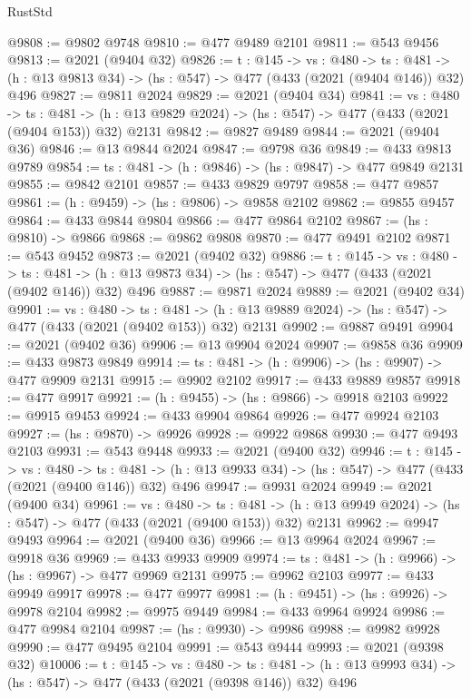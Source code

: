 \begin{lexlean}{RustStd}
\begin{coremodule}
@9808 := @9802 @9748
@9810 := @477 @9489 @2101
@9811 := @543 @9456
@9813 := @2021 (@9404 @32)
@9826 := {t : @145} ->
  {vs : @480} ->
  {ts : @481} -> (h : @13 @9813 @34) -> (hs : @547) -> @477 (@433 (@2021 (@9404 @146)) @32) @496
@9827 := @9811 @2024
@9829 := @2021 (@9404 @34)
@9841 := {vs : @480} ->
  {ts : @481} -> (h : @13 @9829 @2024) -> (hs : @547) -> @477 (@433 (@2021 (@9404 @153)) @32) @2131
@9842 := @9827 @9489
@9844 := @2021 (@9404 @36)
@9846 := @13 @9844 @2024
@9847 := @9798 @36
@9849 := @433 @9813 @9789
@9854 := {ts : @481} -> (h : @9846) -> (hs : @9847) -> @477 @9849 @2131
@9855 := @9842 @2101
@9857 := @433 @9829 @9797
@9858 := @477 @9857
@9861 := (h : @9459) -> (hs : @9806) -> @9858 @2102
@9862 := @9855 @9457
@9864 := @433 @9844 @9804
@9866 := @477 @9864 @2102
@9867 := (hs : @9810) -> @9866
@9868 := @9862 @9808
@9870 := @477 @9491 @2102
@9871 := @543 @9452
@9873 := @2021 (@9402 @32)
@9886 := {t : @145} ->
  {vs : @480} ->
  {ts : @481} -> (h : @13 @9873 @34) -> (hs : @547) -> @477 (@433 (@2021 (@9402 @146)) @32) @496
@9887 := @9871 @2024
@9889 := @2021 (@9402 @34)
@9901 := {vs : @480} ->
  {ts : @481} -> (h : @13 @9889 @2024) -> (hs : @547) -> @477 (@433 (@2021 (@9402 @153)) @32) @2131
@9902 := @9887 @9491
@9904 := @2021 (@9402 @36)
@9906 := @13 @9904 @2024
@9907 := @9858 @36
@9909 := @433 @9873 @9849
@9914 := {ts : @481} -> (h : @9906) -> (hs : @9907) -> @477 @9909 @2131
@9915 := @9902 @2102
@9917 := @433 @9889 @9857
@9918 := @477 @9917
@9921 := (h : @9455) -> (hs : @9866) -> @9918 @2103
@9922 := @9915 @9453
@9924 := @433 @9904 @9864
@9926 := @477 @9924 @2103
@9927 := (hs : @9870) -> @9926
@9928 := @9922 @9868
@9930 := @477 @9493 @2103
@9931 := @543 @9448
@9933 := @2021 (@9400 @32)
@9946 := {t : @145} ->
  {vs : @480} ->
  {ts : @481} -> (h : @13 @9933 @34) -> (hs : @547) -> @477 (@433 (@2021 (@9400 @146)) @32) @496
@9947 := @9931 @2024
@9949 := @2021 (@9400 @34)
@9961 := {vs : @480} ->
  {ts : @481} -> (h : @13 @9949 @2024) -> (hs : @547) -> @477 (@433 (@2021 (@9400 @153)) @32) @2131
@9962 := @9947 @9493
@9964 := @2021 (@9400 @36)
@9966 := @13 @9964 @2024
@9967 := @9918 @36
@9969 := @433 @9933 @9909
@9974 := {ts : @481} -> (h : @9966) -> (hs : @9967) -> @477 @9969 @2131
@9975 := @9962 @2103
@9977 := @433 @9949 @9917
@9978 := @477 @9977
@9981 := (h : @9451) -> (hs : @9926) -> @9978 @2104
@9982 := @9975 @9449
@9984 := @433 @9964 @9924
@9986 := @477 @9984 @2104
@9987 := (hs : @9930) -> @9986
@9988 := @9982 @9928
@9990 := @477 @9495 @2104
@9991 := @543 @9444
@9993 := @2021 (@9398 @32)
@10006 := {t : @145} ->
  {vs : @480} ->
  {ts : @481} -> (h : @13 @9993 @34) -> (hs : @547) -> @477 (@433 (@2021 (@9398 @146)) @32) @496

\end{coremodule}
\end{lexlean}
